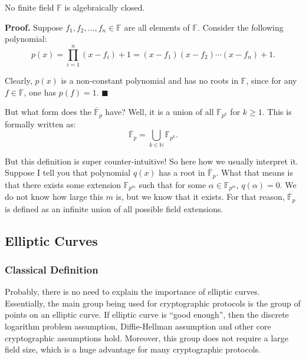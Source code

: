 \documentclass[../lecture-notes.tex]{subfiles}
\begin{document}
\begin{theorem}
    No finite field $\mathbb{F}$ is algebraically closed.
\end{theorem}

\textbf{Proof.} Suppose $f_1,f_2,\dots,f_n \in \mathbb{F}$ are all elements of $\mathbb{F}$. Consider the following polynomial:
\begin{equation}
    p(x) = \prod_{i=1}^n (x-f_i)+1 = (x-f_1)(x-f_2)\cdots(x-f_n)+1.
\end{equation}

Clearly, $p(x)$ is a non-constant polynomial and has no roots in $\mathbb{F}$, since for any $f \in \mathbb{F}$, one has $p(f)=1$. $\blacksquare$

But what form does the $\overline{\mathbb{F}}_{p}$ have? Well, it is a union of all $\mathbb{F}_{p^k}$ for $k \geq 1$. This is formally written as:
\begin{equation}
    \overline{\mathbb{F}}_{p} = \bigcup_{k \in \mathbb{N}} \mathbb{F}_{p^k}.
\end{equation} 

\begin{remark}
    But this definition is super counter-intuitive! So here how we usually interpret it. Suppose I tell you that polynomial $q(x)$ has a root in $\overline{\mathbb{F}}_p$. What that means is that there exists some extension $\mathbb{F}_{p^m}$ such that for some $\alpha \in \mathbb{F}_{p^m}$, $q(\alpha)=0$. We do not know how large this $m$ is, but we know that it exists. For that reason, $\overline{\mathbb{F}}_p$ is defined as an infinite union of all possible field extensions.
\end{remark}

\subsection{Elliptic Curves}

\subsubsection{Classical Definition}

Probably, there is no need to explain the importance of elliptic curves. Essentially, the main group being used for cryptographic 
protocols is the group of points on an elliptic curve. If elliptic curve is ``good enough'', then the discrete logarithm problem assumption,
Diffie-Hellman assumption and other core cryptographic assumptions hold. Moreover, this group does not require
a large field size, which is a huge advantage for many cryptographic protocols.
\end{document}

